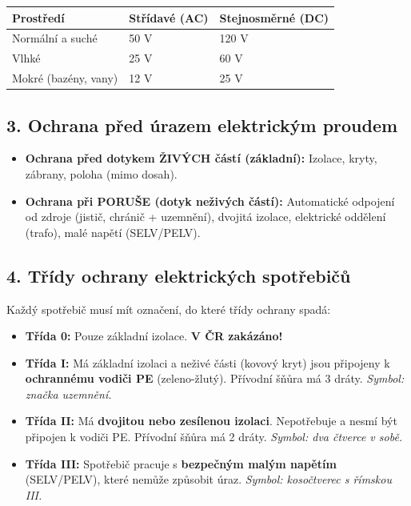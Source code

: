 \documentclass[a4paper,10pt]{article}
\begin{document}
\begin{vysvetlenibox}
\begin{center}
\begin{tabularx}{0.85\linewidth}{@{} l X X @{}}
\toprule
\textbf{Prostředí} & \textbf{Střídavé (AC)} & \textbf{Stejnosměrné (DC)} \\
\midrule
Normální a suché & 50 V & 120 V \\
Vlhké & 25 V & 60 V \\
Mokré (bazény, vany) & 12 V & 25 V \\
\bottomrule
\end{tabularx}
\end{center}

\subsection*{3. Ochrana před úrazem elektrickým proudem}

\begin{itemize}
    \item \textbf{Ochrana před dotykem ŽIVÝCH částí (základní):} Izolace, kryty, zábrany, poloha (mimo dosah).
    \item \textbf{Ochrana při PORUŠE (dotyk neživých částí):} Automatické odpojení od zdroje (jistič, chránič + uzemnění), dvojitá izolace, elektrické oddělení (trafo), malé napětí (SELV/PELV).
\end{itemize}

\subsection*{4. Třídy ochrany elektrických spotřebičů}

Každý spotřebič musí mít označení, do které třídy ochrany spadá:

\begin{itemize}
    \item \textbf{Třída 0:} Pouze základní izolace. \textbf{V ČR zakázáno!}
    \item \textbf{Třída I:} Má základní izolaci a neživé části (kovový kryt) jsou připojeny k \textbf{ochrannému vodiči PE} (zeleno-žlutý). Přívodní šňůra má 3 dráty. \textit{Symbol: značka uzemnění.}
    \item \textbf{Třída II:} Má \textbf{dvojitou nebo zesílenou izolaci}. Nepotřebuje a nesmí být připojen k vodiči PE. Přívodní šňůra má 2 dráty. \textit{Symbol: dva čtverce v sobě.}
    \item \textbf{Třída III:} Spotřebič pracuje s \textbf{bezpečným malým napětím} (SELV/PELV), které nemůže způsobit úraz. \textit{Symbol: kosočtverec s římskou III.}
\end{itemize}


\end{vysvetlenibox}
\end{document}
